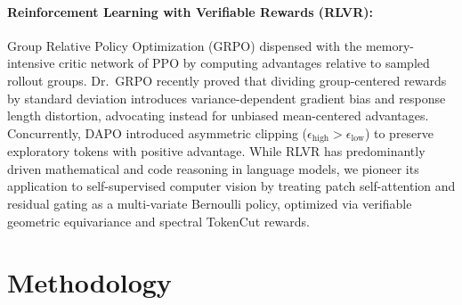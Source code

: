 \documentclass[11pt,a4paper]{article}
\begin{document}
\paragraph{Reinforcement Learning with Verifiable Rewards (RLVR):} Group Relative Policy Optimization (GRPO) \cite{shao2024deepseekmath} dispensed with the memory-intensive critic network of PPO by computing advantages relative to sampled rollout groups. Dr.\ GRPO \cite{liu2025drgrpo} recently proved that dividing group-centered rewards by standard deviation introduces variance-dependent gradient bias and response length distortion, advocating instead for unbiased mean-centered advantages. Concurrently, DAPO \cite{yu2025dapo} introduced asymmetric clipping ($\epsilon_{\text{high}} > \epsilon_{\text{low}}$) to preserve exploratory tokens with positive advantage. While RLVR has predominantly driven mathematical and code reasoning in language models, we pioneer its application to self-supervised computer vision by treating patch self-attention and residual gating as a multi-variate Bernoulli policy, optimized via verifiable geometric equivariance and spectral TokenCut \cite{wang2022tokencut} rewards.

\section{Methodology}
\label{sec:method}
\end{document}
